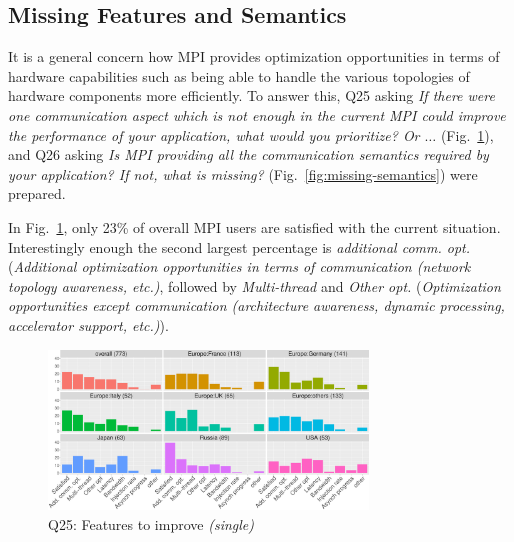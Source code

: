 \documentclass[preprint,5p,times]{elsarticle}
\def\myquote#1{{\it #1}}
\begin{document}
\subsection{Missing Features and Semantics}

It is a general concern how MPI provides optimization
opportunities in terms of hardware capabilities such as being able to
handle the various topologies of hardware components more
efficiently. To answer this, Q25 asking \myquote{If there were one
communication aspect which is not enough in the current MPI could
improve the performance of your application, what would you
prioritize? Or $\ldots$} (Fig.~\ref{fig:missing-features}), and Q26 asking
\myquote{Is MPI providing all the communication semantics required by your
application? If not, what is missing?}
(Fig.~\ref{fig:missing-semantics}) were prepared.

In Fig.~\ref{fig:missing-features}, only 23\% of overall MPI users
are satisfied with the current situation.
Interestingly enough the second largest percentage is
\myquote{additional comm. opt.} (\myquote{Additional optimization
  opportunities in terms of communication (network topology awareness,
  etc.)}, followed by \myquote{Multi-thread} and \myquote{Other
  opt.} (\myquote{Optimization opportunities except communication
  (architecture awareness, dynamic processing, accelerator support,
  etc.)}).

\begin{figure}[htb]
\begin{center}
\includegraphics[width=8.5cm]{R-scripts/Q25.pdf}
\caption{Q25: Features to improve {\it(single)}}
\label{fig:missing-features}
\end{center}
\end{figure}
\end{document}
